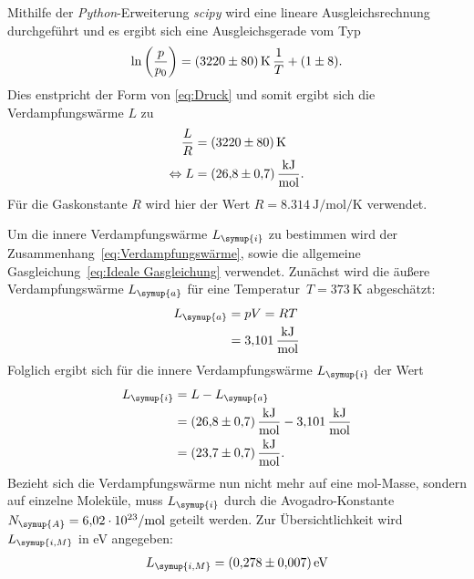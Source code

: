 Mithilfe der 
\textit{Python}-Erweiterung \textit{scipy}\cite{scipy} wird eine lineare Ausgleichsrechnung durchgeführt und es ergibt sich eine
Ausgleichsgerade vom Typ
\begin{equation*}
  \ln\left(\frac{p}{p_0}\right)= \qty{3220+-80}{\kelvin} \, \frac{1}{T} + (\num{1+-8}).
\end{equation*}
Dies enstpricht der Form von \eqref{eq:Druck} und somit ergibt sich die Verdampfungswärme $L$ zu
\begin{align*}
  \frac{L}{R} &= \qty{3220+-80}{\kelvin} \\
  \Leftrightarrow L &= \qty{26,8+-0,7}{\kilo\joule\per\mol}.
\end{align*}
Für die Gaskonstante $R$ wird hier der Wert $R = \qty{8,314}{\joule\per\mol\per\kelvin}$ \cite{czichos} verwendet.

Um die innere Verdampfungswärme $L_{\symup{i}}$ zu bestimmen wird der Zusammenhang~\eqref{eq:Verdampfungswärme}, sowie die allgemeine 
Gasgleichung~\eqref{eq:Ideale Gasgleichung} verwendet. Zunächst wird die äußere Verdampfungswärme $L_{\symup{a}}$ für eine 
Temperatur~$T = \qty{373}{\kelvin}$ abgeschätzt:
\begin{align*}
  L_{\symup{a}} &= pV = RT \\
                &= \qty{3,101}{\kilo\joule\per\mol}
\end{align*}
Folglich ergibt sich für die innere Verdampfungswärme $L_{\symup{i}}$ der Wert
\begin{align*}
  L_{\symup{i}} &= L - L_{\symup{a}} \\
                &= \qty{26,8+-0,7}{\kilo\joule\per\mol} - \qty{3,101}{\kilo\joule\per\mol} \\
                &= \qty{23,7+-0,7}{\kilo\joule\per\mol}.
\end{align*}
Bezieht sich die Verdampfungswärme nun nicht mehr auf eine mol-Masse, sondern auf einzelne Moleküle, muss $L_{\symup{i}}$ durch die
Avogadro-Konstante $N_{\symup{A}}=\qty{6,02e23}{\per\mol}$ \cite{czichos} geteilt werden. Zur Übersichtlichkeit wird $L_{\symup{i, M}}$ in eV angegeben:
\begin{align*}
  L_{\symup{i, M}} = \qty{0.278+-0.007}{\electronvolt}
\end{align*}

